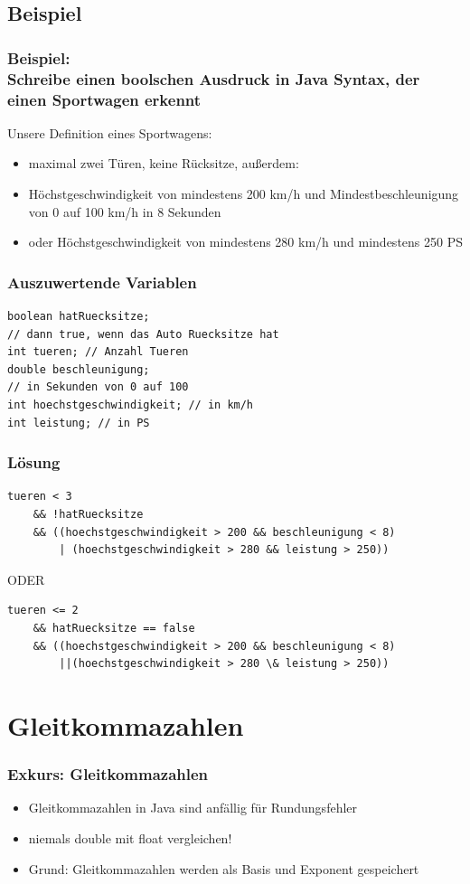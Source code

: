 \documentclass[final]{beamer}
\begin{document}
\subsection{Beispiel}
\begin{frame}
	\frametitle{Beispiel: \\Schreibe einen boolschen Ausdruck in Java Syntax, der einen Sportwagen erkennt}
	Unsere Definition eines Sportwagens:	\\
	\begin{itemize}
		\item{maximal zwei Türen, keine Rücksitze, außerdem:}
		\item{Höchstgeschwindigkeit von mindestens 200 km/h und  Mindestbeschleunigung von 0 auf 100 km/h in 8 Sekunden}
		\item{oder Höchstgeschwindigkeit von mindestens 280 km/h und mindestens 250 PS}
	\end{itemize}
\end{frame}

\begin{frame}[containsverbatim]
	\frametitle{Auszuwertende Variablen}
	\begin{lstlisting}
boolean hatRuecksitze; 
// dann true, wenn das Auto Ruecksitze hat
int tueren; // Anzahl Tueren
double beschleunigung; 
// in Sekunden von 0 auf 100
int hoechstgeschwindigkeit; // in km/h
int leistung; // in PS
	\end{lstlisting}
\end{frame}


\begin{frame}[containsverbatim]
	\frametitle{Lösung}
\begin{lstlisting}
tueren < 3
	&& !hatRuecksitze
	&& ((hoechstgeschwindigkeit > 200 && beschleunigung < 8)
		| (hoechstgeschwindigkeit > 280 && leistung > 250))
\end{lstlisting}
\vfill
ODER
\vfill
\begin{lstlisting}
tueren <= 2
	&& hatRuecksitze == false
	&& ((hoechstgeschwindigkeit > 200 && beschleunigung < 8)
		||(hoechstgeschwindigkeit > 280 \& leistung > 250))
\end{lstlisting}

\end{frame}

\section{Gleitkommazahlen}
\begin{frame}
	\frametitle{Exkurs: Gleitkommazahlen}
	\begin{itemize}
		\item{Gleitkommazahlen in Java sind anfällig für Rundungsfehler}
		\item{niemals double mit float vergleichen!}
		\item{Grund: Gleitkommazahlen werden als Basis und Exponent gespeichert}
	\end{itemize}
\end{frame}
\end{document}
